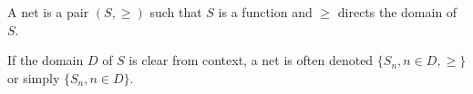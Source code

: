 A net is a pair $(S, \geq)$ such that $S$ is a function and $\geq$ directs the domain of $S$.

If the domain $D$ of $S$ is clear from context, a net is often denoted $\{S_n, n \in D, \geq\}$ or simply $\{S_n, n \in D\}$.

